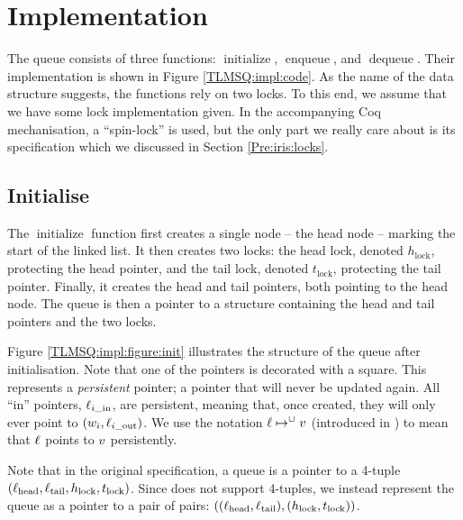 \documentclass[a4paper, 10pt]{report}
\theoremstyle{definition}
\newcommand{\initialise}{\operatorname{initialize}}
\newcommand{\enqueue}{\operatorname{enqueue}}
\newcommand{\dequeue}{\operatorname{dequeue}}
\newcommand{\locinM}[1]{\loc_{#1\_\mathrm{in}}}
\newcommand{\locoutM}[1]{\loc_{#1\_\mathrm{out}}}
\newcommand{\locN}[1]{\loc_{\mathrm{#1}}}
\newcommand{\lochead}{\locN{head}}
\newcommand{\loctail}{\locN{tail}}
\newcommand{\nodeval}{\valB}
\newcommand{\nodevalM}[1]{\nodeval_{#1}}
\newcommand{\Hlock}{h_{\mathrm{lock}}}
\newcommand{\Tlock}{t_{\mathrm{lock}}}
\begin{document}
\section{Implementation}
\label{TLMSQ:section:implementation}

The queue consists of three functions: $\initialise$, $\enqueue$, and $\dequeue$. Their implementation is shown in Figure \ref{TLMSQ:impl:code}. As the name of the data structure suggests, the functions rely on two locks. To this end, we assume that we have some lock implementation given. In the accompanying Coq mechanisation, a ``spin-lock'' is used, but the only part we really care about is its specification which we discussed in Section \ref{Pre:iris:locks}.

\subsection{Initialise}
\label{TLMSQ:implementation:sub:initialise}

The $\initialise$ function first creates a single node -- the head node -- marking the start of the linked list. It then creates two locks: the head lock, denoted $\Hlock$, protecting the head pointer, and the tail lock, denoted $\Tlock$, protecting the tail pointer. Finally, it creates the head and tail pointers, both pointing to the head node. The queue is then a pointer to a structure containing the head and tail pointers and the two locks.

Figure \ref{TLMSQ:impl:figure:init} illustrates the structure of the queue after initialisation. Note that one of the pointers is decorated with a square. This represents a \emph{persistent} pointer; a pointer that will never be updated again. All ``in'' pointers, $\locinM{i}$, are persistent, meaning that, once created, they will only ever point to $(\nodevalM{i}, \locoutM{i})$. We use the notation $\ell \mapsto^{\mathop{\Box}} v$ (introduced in \citet{DBLP:conf/cpp/VindumB21}) to mean that $\ell$ points to $v$ persistently.

Note that in the original specification, a queue is a pointer to a 4-tuple $(\lochead, \loctail, \Hlock, \Tlock)$. Since \heaplang does not support 4-tuples, we instead represent the queue as a pointer to a pair of pairs: $\left((\lochead, \loctail), (\Hlock, \Tlock)\right)$.
\end{document}
